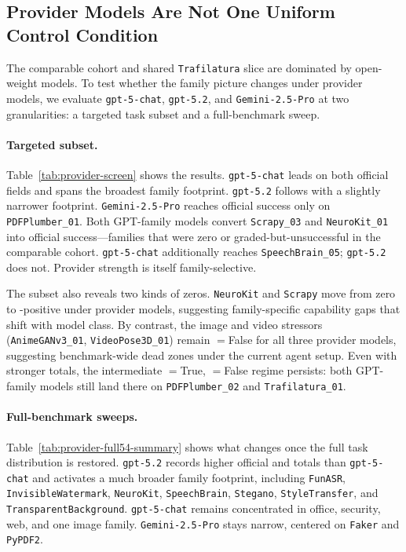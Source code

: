 

\subsection{Provider Models Are Not One Uniform Control Condition}

The comparable cohort and shared \texttt{Trafilatura} slice are dominated by
open-weight models. To test whether the family picture changes under provider
models, we evaluate \texttt{gpt-5-chat}, \texttt{gpt-5.2}, and
\texttt{Gemini-2.5-Pro} at two granularities: a targeted task subset and a
full-benchmark sweep.

\paragraph{Targeted subset.}
Table~\ref{tab:provider-screen} shows the results. \texttt{gpt-5-chat} leads
on both official fields and spans the broadest family footprint.
\texttt{gpt-5.2} follows with a slightly narrower footprint.
\texttt{Gemini-2.5-Pro} reaches official success only on
\texttt{PDFPlumber\_01}. Both GPT-family models convert \texttt{Scrapy\_03} and
\texttt{NeuroKit\_01} into official \resultmetric success---families that were
zero or graded-but-unsuccessful in the comparable cohort.
\texttt{gpt-5-chat} additionally reaches \texttt{SpeechBrain\_05};
\texttt{gpt-5.2} does not. Provider strength is itself family-selective.



The subset also reveals two kinds of zeros. \texttt{NeuroKit} and
\texttt{Scrapy} move from zero to \resultmetric-positive under provider models,
suggesting family-specific capability gaps that shift with model class. By
contrast, the image and video stressors (\texttt{AnimeGANv3\_01},
\texttt{VideoPose3D\_01}) remain \processmetric$=$False for all three provider
models, suggesting benchmark-wide dead zones under the current agent setup.
Even with stronger totals, the intermediate \processmetric$=$True,
\resultmetric$=$False regime persists: both GPT-family models still land there
on \texttt{PDFPlumber\_02} and \texttt{Trafilatura\_01}.

\paragraph{Full-benchmark sweeps.}
Table~\ref{tab:provider-full54-summary} shows what changes once the full task
distribution is restored. \texttt{gpt-5.2} records higher official
\processmetric and \resultmetric totals than \texttt{gpt-5-chat} and activates
a much broader family footprint, including \texttt{FunASR},
\texttt{InvisibleWatermark}, \texttt{NeuroKit}, \texttt{SpeechBrain},
\texttt{Stegano}, \texttt{StyleTransfer}, and \texttt{TransparentBackground}.
\texttt{gpt-5-chat} remains concentrated in office, security, web, and one
image family. \texttt{Gemini-2.5-Pro} stays narrow, centered on \texttt{Faker}
and \texttt{PyPDF2}.

